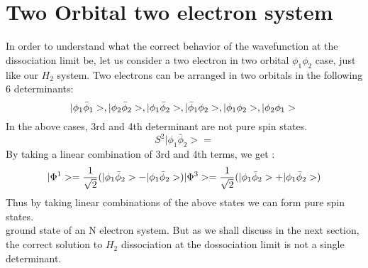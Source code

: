 \documentclass[11pt]{article}   	%
\begin{document}
\section{Two Orbital two electron system}
	In order to understand what the correct behavior of the wavefunction at the dissociation limit be, let us consider a two electron in two 
	orbital $\phi_1 \phi_2$ case, just like our $H_2$ system. Two electrons can be arranged in two orbitals in the following 6 determinants: \\
	\begin{equation}
		|\phi_1\bar{\phi}_1>, |\phi_2\bar{\phi}_2>, |\phi_1\bar{\phi}_2>, |\bar{\phi}_1\phi_2>, |\phi_1\phi_2>, |\phi_2\phi_1>\\ 
	\end{equation}
	In the above cases, 3rd and 4th determinant are not pure spin states. \\
	$$S^2|\phi_1\bar{\phi}_2>=$$
	By taking a linear combination of 3rd and 4th terms, we get :\\
	\begin{equation}
		|\Phi^1>=\frac{1}{\sqrt{2}}(|\phi_1\bar{\phi}_2>-|\phi_1\bar{\phi}_2>)\\	
		|\Phi^3>=\frac{1}{\sqrt{2}}(|\phi_1\bar{\phi}_2>+|\phi_1\bar{\phi}_2>)\\
	\end{equation}
	Thus by taking linear combinations of the above states we can form pure spin states.\\
	ground state of an N electron system. But as we shall discuss in the next section, the correct solution to $H_2$ dissociation at the dossociation limit is not a single determinant. \\
\end{document}
